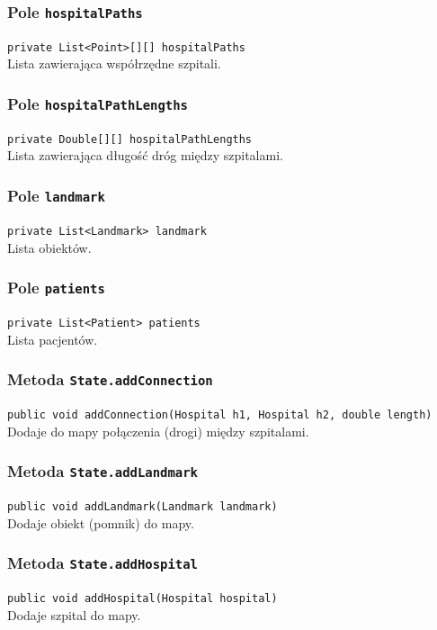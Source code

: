 \documentclass{article}
\begin{document}
\subsubsection{Pole \texttt{hospitalPaths}}
\texttt{private List<Point>[][] hospitalPaths} \\
Lista zawierająca współrzędne szpitali.

\subsubsection{Pole \texttt{hospitalPathLengths}}
\texttt{private Double[][] hospitalPathLengths} \\
Lista zawierająca długość dróg między szpitalami.

\subsubsection{Pole \texttt{landmark}}
\texttt{private List<Landmark> landmark} \\
Lista obiektów.

\subsubsection{Pole \texttt{patients}}
\texttt{private List<Patient> patients} \\
Lista pacjentów.

\subsubsection{Metoda \texttt{State.addConnection}}
\texttt{public void addConnection(Hospital h1, Hospital h2, double length)} \\
Dodaje do mapy połączenia (drogi) między szpitalami.

\subsubsection{Metoda \texttt{State.addLandmark}}
\texttt{public void addLandmark(Landmark landmark)} \\
Dodaje obiekt (pomnik) do mapy.

\subsubsection{Metoda \texttt{State.addHospital}}
\texttt{public void addHospital(Hospital hospital)} \\
Dodaje szpital do mapy.
\end{document}
